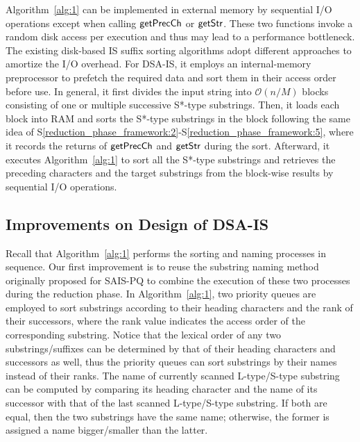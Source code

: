 \documentclass[10pt,journal,compsoc]{IEEEtran}
\begin{document}
Algorithm~\ref{alg:1} can be implemented in external memory by sequential I/O operations except when calling ${\sf getPrecCh}$ or ${\sf getStr}$. These two functions invoke a random disk access per execution and thus may lead to a performance bottleneck. The existing disk-based IS suffix sorting algorithms adopt different approaches to amortize the I/O overhead. For DSA-IS, it employs an internal-memory preprocessor to prefetch the required data and sort them in their access order before use. In general, it first divides the input string into $\mathcal{O}(n/M)$ blocks consisting of one or multiple successive S*-type substrings. Then, it loads each block into RAM and sorts the S*-type substrings in the block following the same idea of S\ref{reduction_phase_framework:2}-S\ref{reduction_phase_framework:5}, where it records the returns of ${\sf getPrecCh}$ and ${\sf getStr}$ during the sort. Afterward, it executes Algorithm~\ref{alg:1} to sort all the S*-type substrings and retrieves the preceding characters and the target substrings from the block-wise results by sequential I/O operations.

\subsection{Improvements on Design of DSA-IS}

Recall that Algorithm~\ref{alg:1} performs the sorting and naming processes in sequence. Our first improvement is to reuse the substring naming method originally proposed for SAIS-PQ to combine the execution of these two processes during the reduction phase. In Algorithm~\ref{alg:1}, two priority queues are employed to sort substrings according to their heading characters and the rank of their successors, where the rank value indicates the access order of the corresponding substring. Notice that the lexical order of any two substrings/suffixes can be determined by that of their heading characters and successors as well, thus the priority queues can sort substrings by their names instead of their ranks. The name of currently scanned L-type/S-type substring can be computed by comparing its heading character and the name of its successor with that of the last scanned L-type/S-type substring. If both are equal, then the two substrings have the same name; otherwise, the former is assigned a name bigger/smaller than the latter. 
\end{document}
